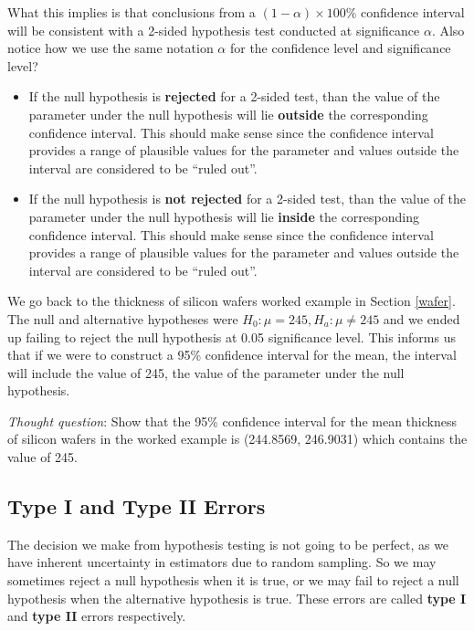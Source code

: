 \documentclass[
]{book}
\begin{document}
What this implies is that conclusions from a \((1-\alpha) \times 100\%\) confidence interval will be consistent with a 2-sided hypothesis test conducted at significance \(\alpha\). Also notice how we use the same notation \(\alpha\) for the confidence level and significance level?

\begin{itemize}
\item
  If the null hypothesis is \textbf{rejected} for a 2-sided test, than the value of the parameter under the null hypothesis will lie \textbf{outside} the corresponding confidence interval. This should make sense since the confidence interval provides a range of plausible values for the parameter and values outside the interval are considered to be ``ruled out''.
\item
  If the null hypothesis is \textbf{not rejected} for a 2-sided test, than the value of the parameter under the null hypothesis will lie \textbf{inside} the corresponding confidence interval. This should make sense since the confidence interval provides a range of plausible values for the parameter and values outside the interval are considered to be ``ruled out''.
\end{itemize}

We go back to the thickness of silicon wafers worked example in Section \ref{wafer}. The null and alternative hypotheses were \(H_0: \mu = 245, H_a: \mu \neq 245\) and we ended up failing to reject the null hypothesis at 0.05 significance level. This informs us that if we were to construct a 95\% confidence interval for the mean, the interval will include the value of 245, the value of the parameter under the null hypothesis.

\emph{Thought question}: Show that the 95\% confidence interval for the mean thickness of silicon wafers in the worked example is (244.8569, 246.9031) which contains the value of 245.

\subsection{Type I and Type II Errors}\label{type-i-and-type-ii-errors}

The decision we make from hypothesis testing is not going to be perfect, as we have inherent uncertainty in estimators due to random sampling. So we may sometimes reject a null hypothesis when it is true, or we may fail to reject a null hypothesis when the alternative hypothesis is true. These errors are called \textbf{type I} and \textbf{type II} errors respectively.
\end{document}
